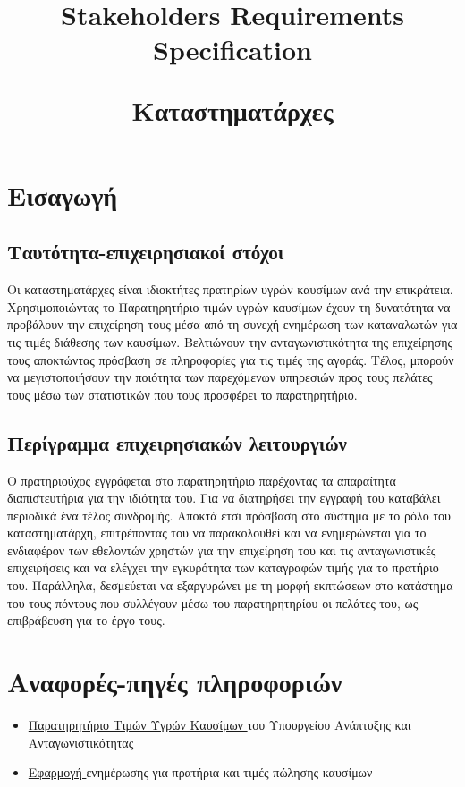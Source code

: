 \documentclass[a4paper,oneside, 12pt]{article}
\title{Stakeholders Requirements Specification\\
\begin{flushleft}
	Καταστηματάρχες
\end{flushleft}}
\date{\vspace{-5ex}}
\begin{document}
\maketitle
\section{Εισαγωγή}
\subsection{Ταυτότητα-επιχειρησιακοί στόχοι}

Οι καταστηματάρχες είναι ιδιοκτήτες πρατηρίων υγρών καυσίμων ανά την επικράτεια.
Χρησιμοποιώντας το Παρατηρητήριο τιμών υγρών καυσίμων έχουν τη δυνατότητα να
προβάλουν την επιχείρηση τους μέσα από τη συνεχή ενημέρωση των καταναλωτών για
τις τιμές διάθεσης των καυσίμων. Βελτιώνουν την ανταγωνιστικότητα της επιχείρησης
τους αποκτώντας πρόσβαση σε πληροφορίες για τις τιμές της αγοράς. Τέλος, μπορούν
να μεγιστοποιήσουν την ποιότητα των παρεχόμενων υπηρεσιών προς τους πελάτες τους
μέσω των στατιστικών που τους προσφέρει το παρατηρητήριο.

\subsection{Περίγραμμα επιχειρησιακών λειτουργιών}

Ο πρατηριούχος εγγράφεται στο παρατηρητήριο παρέχοντας τα απαραίτητα
διαπιστευτήρια για την ιδιότητα του. Για να διατηρήσει την εγγραφή του καταβάλει
περιοδικά ένα τέλος συνδρομής. Αποκτά έτσι πρόσβαση στο σύστημα με το ρόλο του
καταστηματάρχη, επιτρέποντας του να παρακολουθεί και να ενημερώνεται για το
ενδιαφέρον των εθελοντών χρηστών για την επιχείρηση του και τις ανταγωνιστικές
επιχειρήσεις και να ελέγχει την εγκυρότητα των καταγραφών τιμής για το πρατήριο
του. Παράλληλα, δεσμεύεται να εξαργυρώνει με τη μορφή εκπτώσεων στο κατάστημα
του τους πόντους που συλλέγουν μέσω του παρατηρητηρίου οι πελάτες του, ως
επιβράβευση για το έργο τους.

\section{Αναφορές-πηγές πληροφοριών}

\begin{itemize}
		
	\item \href{http://www.fuelprices.gr/}{Παρατηρητήριο Τιμών Υγρών Καυσίμων }
	του Υπουργείου Ανάπτυξης και Ανταγωνιστικότητας
	
	\item \href{https://fuelgr.gr}{Εφαρμογή }
	ενημέρωσης για πρατήρια και τιμές πώλησης καυσίμων
	
	
\end{itemize}
\end{document}
